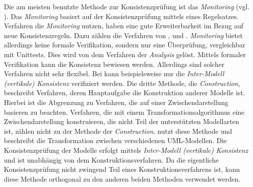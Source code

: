 Die am meisten benutzte Methode zur Konsistenzprüfung ist das \emph{Monitoring} (vgl. \cite{Usman2008}).
Das \emph{Monitoring} basiert auf der Konsistenzprüfung mittels eines Regelsatzes. 
Verfahren die \emph{Monitoring} nutzen, haben eine gute Erweiterbarkeit im Bezug auf neue Konsistenzregeln.
Dazu zählen die Verfahren von \cite{Rasch2003}, \cite{Mens2005} und \cite{Egyed2006}.
\emph{Monitoring} bietet allerdings keine formale Verifikation, sondern nur eine Überprüfung, vergleichbar mit Unittests.
Dies wird von dem Verfahren der \emph{Analysis} gelöst.
Mittels formaler Verifikation kann die Konsistenz bewiesen werden.
Allerdings sind solcher Verfahren nicht sehr flexibel.
Bei \cite{Shinkawa2006} kann beispielsweise nur die \emph{Inter-Modell (vertikale) Konsistenz} verifiziert werden.
Die dritte Methode, die \emph{Construction}, beschreibt Verfahren, deren Hauptaufgabe die Konstruktion anderer Modelle ist.
Hierbei ist die Abgrenzung zu Verfahren, die auf einer Zwischendarstellung basieren zu beachten.
Verfahren, die mit einem Transformationsalgorithmus eine Zwischendarstellung konstruieren, die nicht Teil der unterstützten Modellarten ist, zählen nicht zu der Methode der \emph{Construction}.
\cite{Egyed2001} nutzt diese Methode und beschreibt die Transformation zwischen verschiedenen UML-Modellen.
Die Konsistenzprüfung der Modelle erfolgt mittels \emph{Inter-Modell (vertikale) Konsistenz} und ist unabhängig von dem Konstruktionsverfahren.
Da die eigentliche Konsistenzprüfung nicht zwingend Teil eines Konstruktionsverfahrens ist, kann diese Methode orthogonal zu den anderen beiden Methoden verwendet werden.
